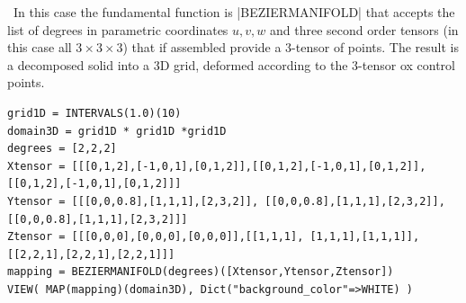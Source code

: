 \begin{coding}[Algebraic computation of FE = $\delta_1$]
%
%

\begin{condition}\ In this case the fundamental function is |BEZIERMANIFOLD| that accepts the list of degrees in parametric coordinates $u,v,w$ and three second order tensors (in this case all $3\times 3\times 3$) that if assembled provide a 3-tensor of points. The result is a decomposed solid into a 3D grid, deformed according to the 3-tensor ox control points. 
\begin{lstlisting}[language=JuliaLocal, style=julia, mathescape=true]
grid1D = INTERVALS(1.0)(10)
domain3D = grid1D * grid1D *grid1D
degrees = [2,2,2]
Xtensor = [[[0,1,2],[-1,0,1],[0,1,2]],[[0,1,2],[-1,0,1],[0,1,2]], [[0,1,2],[-1,0,1],[0,1,2]]]
Ytensor = [[[0,0,0.8],[1,1,1],[2,3,2]], [[0,0,0.8],[1,1,1],[2,3,2]], [[0,0,0.8],[1,1,1],[2,3,2]]]
Ztensor = [[[0,0,0],[0,0,0],[0,0,0]],[[1,1,1], [1,1,1],[1,1,1]], [[2,2,1],[2,2,1],[2,2,1]]] 
mapping = BEZIERMANIFOLD(degrees)([Xtensor,Ytensor,Ztensor])
VIEW( MAP(mapping)(domain3D), Dict("background_color"=>WHITE) )
\end{lstlisting}
\end{condition}



\end{coding}
